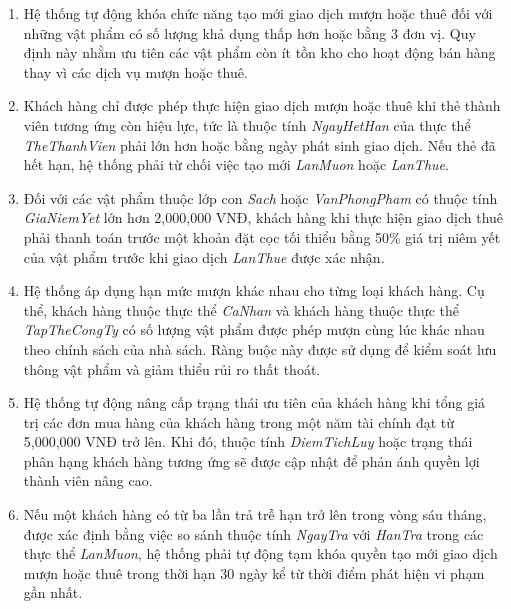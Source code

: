 \begin{enumerate}
    \item Hệ thống tự động khóa chức năng tạo mới giao dịch mượn hoặc thuê đối với những vật phẩm có số lượng khả dụng thấp hơn hoặc bằng 3 đơn vị. Quy định này nhằm ưu tiên các vật phẩm còn ít tồn kho cho hoạt động bán hàng thay vì các dịch vụ mượn hoặc thuê.

    \item Khách hàng chỉ được phép thực hiện giao dịch mượn hoặc thuê khi thẻ thành viên tương ứng còn hiệu lực, tức là thuộc tính \textit{NgayHetHan} của thực thể \textit{TheThanhVien} phải lớn hơn hoặc bằng ngày phát sinh giao dịch. Nếu thẻ đã hết hạn, hệ thống phải từ chối việc tạo mới \textit{LanMuon} hoặc \textit{LanThue}.

    \item Đối với các vật phẩm thuộc lớp con \textit{Sach} hoặc \textit{VanPhongPham} có thuộc tính \textit{GiaNiemYet} lớn hơn 2{,}000{,}000 VNĐ, khách hàng khi thực hiện giao dịch thuê phải thanh toán trước một khoản đặt cọc tối thiểu bằng 50\% giá trị niêm yết của vật phẩm trước khi giao dịch \textit{LanThue} được xác nhận.

    \item Hệ thống áp dụng hạn mức mượn khác nhau cho từng loại khách hàng. Cụ thể, khách hàng thuộc thực thể \textit{CaNhan} và khách hàng thuộc thực thể \textit{TapTheCongTy} có số lượng vật phẩm được phép mượn cùng lúc khác nhau theo chính sách của nhà sách. Ràng buộc này được sử dụng để kiểm soát lưu thông vật phẩm và giảm thiểu rủi ro thất thoát.

    \item Hệ thống tự động nâng cấp trạng thái ưu tiên của khách hàng khi tổng giá trị các đơn mua hàng của khách hàng trong một năm tài chính đạt từ 5{,}000{,}000 VNĐ trở lên. Khi đó, thuộc tính \textit{DiemTichLuy} hoặc trạng thái phân hạng khách hàng tương ứng sẽ được cập nhật để phản ánh quyền lợi thành viên nâng cao.

    \item Nếu một khách hàng có từ ba lần trả trễ hạn trở lên trong vòng sáu tháng, được xác định bằng việc so sánh thuộc tính \textit{NgayTra} với \textit{HanTra} trong các thực thể \textit{LanMuon}, hệ thống phải tự động tạm khóa quyền tạo mới giao dịch mượn hoặc thuê trong thời hạn 30 ngày kể từ thời điểm phát hiện vi phạm gần nhất.
\end{enumerate}